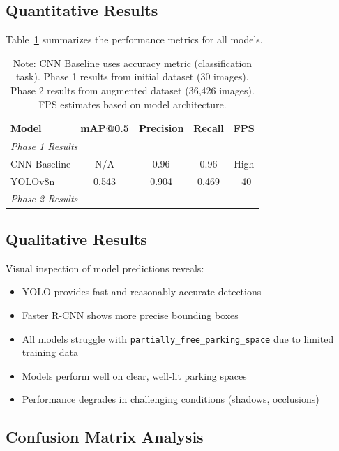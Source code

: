 \documentclass[12pt,a4paper]{article}
\begin{document}
\subsection{Quantitative Results}

Table~\ref{tab:results} summarizes the performance metrics for all models.

\begin{table}[H]
\centering
\caption{Model Performance Comparison}
\label{tab:results}
\begin{tabular}{@{}lcccc@{}}
\toprule
\textbf{Model} & \textbf{mAP@0.5} & \textbf{Precision} & \textbf{Recall} & \textbf{FPS} \\
\midrule
\multicolumn{5}{l}{\textit{Phase 1 Results}} \\
\midrule
CNN Baseline & N/A & 0.96 & 0.96 & High \\
YOLOv8n & 0.543 & 0.904 & 0.469 & ~40 \\
\midrule
\multicolumn{5}{l}{\textit{Phase 2 Results}} \\
\midrule\bottomrule
\end{tabular}
\caption*{Note: CNN Baseline uses accuracy metric (classification task). Phase 1 results from initial dataset (30 images). Phase 2 results from augmented dataset (36,426 images). FPS estimates based on model architecture.}
\end{table}

\subsection{Qualitative Results}

Visual inspection of model predictions reveals:
\begin{itemize}
    \item YOLO provides fast and reasonably accurate detections
    \item Faster R-CNN shows more precise bounding boxes
    \item All models struggle with \texttt{partially\_free\_parking\_space} due to limited training data
    \item Models perform well on clear, well-lit parking spaces
    \item Performance degrades in challenging conditions (shadows, occlusions)
\end{itemize}

\subsection{Confusion Matrix Analysis}
\end{document}
